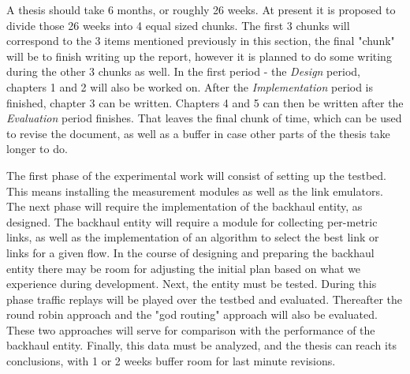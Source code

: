 A thesis should take 6 months, or roughly 26 weeks. At present it is proposed to divide those 26 weeks into 4 equal sized chunks. The first 3 chunks will correspond to the 3 items mentioned previously in this section, the final "chunk" will be to finish writing up the report, however it is planned to do some writing during the other 3 chunks as well. In the first period - the \textit{Design} period, chapters 1 and 2 will also be worked on. After the \textit{Implementation} period is finished, chapter 3 can be written. Chapters 4 and 5 can then be written after the \textit{Evaluation} period finishes. That leaves the final chunk of time, which can be used to revise the document, as well as a buffer in case other parts of the thesis take longer to do.

The first phase of the experimental work will consist of setting up the testbed. This means installing the measurement modules as well as the link emulators. The next phase will require the implementation of the backhaul entity, as designed. The backhaul entity will require a module for collecting per-metric links, as well as the implementation of an algorithm to select the best link or links for a given flow. In the course of designing and preparing the backhaul entity there may be room for adjusting the initial plan based on what we experience during development. Next, the entity must be tested. During this phase traffic replays will be played over the testbed and evaluated. Thereafter the round robin approach and the "god routing" approach will also be evaluated. These two approaches will serve for comparison with the performance of the backhaul entity. Finally, this data must be analyzed, and the thesis can reach its conclusions, with 1 or 2 weeks buffer room for last minute revisions.


